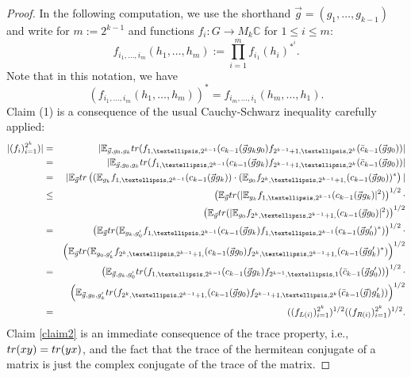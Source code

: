 \documentclass[a4paper,11pt]{amsproc}
\theoremstyle{plain}
\theoremstyle{definition}
\begin{document}
\begin{proof}
In the following computation, we use the shorthand $\vec{g} = (g_1,\dots,g_{k-1})$ and write for $m:=2^{k-1}$ and functions $f_i \colon G \to M_k \mathbb C$ for $1 \leq i \leq m$:
$$f_{i_1,\dots,i_{m}}(h_1,\dots,h_{m}) := \prod_{i=1}^{m} f_{i_1}(h_i)^{*^{i}}.$$ Note that in this notation, we have
$$(f_{i_1,\dots,i_{m}}(h_1,\dots,h_m))^* = f_{i_{m},\dots,i_1}(h_{m},\dots,h_1).$$
Claim (1) is a consequence of the usual Cauchy-Schwarz inequality carefully applied:
\begin{eqnarray*}  |(f_{i})_{i=1}^{2^k})|  &=& \mathbb |\mathbb E_{\vec{g},g_0,g_k} {\rm tr}(f_{1,\dots,2^{k-1}}(c_{k-1}(\vec{g}g_k g_0) f_{2^{k-1}+1,\dots,2^{k}}(\bar c_{k-1}(\vec{g}g_0))|\\
&=& |\mathbb E_{\vec{g},g_0,g_k} {\rm tr}(f_{1,\dots,2^{k-1}}(c_{k-1}(\vec{g}g_k) f_{2^{k-1}+1,\dots,2^{k}}(\bar c_{k-1}(\vec{g}g_0))|\\
&=& |\mathbb E_{\vec{g}} {\rm tr}\left( (\mathbb E_{g_k} f_{1,\dots,2^{k-1}}(c_{k-1}(\vec{g}g_k)) \cdot (\mathbb E_{g_0} f_{2^{k},\dots,2^{k-1}+1,}( c_{k-1}(\vec{g}g_0))^* \right) |\\
&\leq& \left ( \mathbb E_{\vec{g}} {\rm tr}(|\mathbb E_{g_k}f_{1,\dots,2^{k-1}}(c_{k-1}(\vec{g}g_k)|^2) \right)^{1/2} \cdot \\
&& \left( \mathbb E_{\vec{g}} {\rm tr}(|\mathbb E_{g_0} f_{2^{k},\dots,2^{k-1}+1,}(c_{k-1}(\vec{g}g_0)|^2) \right)^{1/2} \\
&=& \left ( \mathbb E_{\vec{g}} {\rm tr}(\mathbb E_{g_k,g'_0}f_{1,\dots,2^{k-1}}(c_{k-1}(\vec{g}g_k)f_{1,\dots,2^{k-1}}(c_{k-1}(\vec{g}g'_0)^*) \right)^{1/2} \cdot \\
&& \left( \mathbb E_{\vec{g}} {\rm tr}(\mathbb E_{g_0,g'_k} f_{2^{k},\dots,2^{k-1}+1,}(c_{k-1}(\vec{g}g_0)f_{2^{k},\dots,2^{k-1}+1,}( c_{k-1}(\vec{g}g'_k)^*) \right)^{1/2} \\
&=& \left ( \mathbb E_{\vec{g},g_k,g'_0} {\rm tr}(f_{1,\dots,2^{k-1}}(c_{k-1}(\vec{g}g_k)f_{2^{k-1},\dots,1}(\bar c_{k-1}(\vec{g}g'_0)) \right)^{1/2} \cdot \\
&& \left( \mathbb E_{\vec{g},g_0,g'_k} {\rm tr}( f_{2^{k},\dots,2^{k-1}+1,}( c_{k-1}(\vec{g}g_0)f_{2^{k-1}+1,\dots,2^{k}}( \bar c_{k-1}(\vec{g})g'_k)) \right)^{1/2} \\
&=& ((f_{L(i)})_{i=1}^{2^k})^{1/2}((f_{R(i)})_{i=1}^{2^k})^{1/2}.
\end{eqnarray*}
Claim \eqref{claim2} is an immediate consequence of the trace property, i.e., ${\rm tr}(xy)={\rm tr}(yx)$, and the fact that the trace of the hermitean conjugate of a matrix is just the complex conjugate of the trace of the matrix.
\end{proof}
\end{document}
